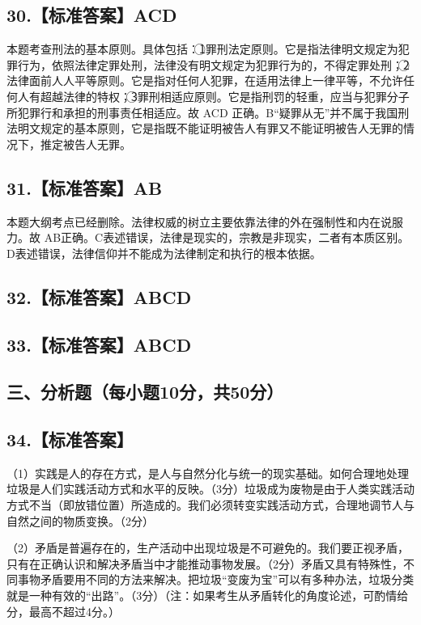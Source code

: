 \documentclass[UTF8,11pt]{ctexart}
\begin{document}
\subsection*{30.【标准答案】ACD}

本题考查刑法的基本原则。具体包括：\textcircled{1}罪刑法定原则。它是指法律明文规定为犯罪行为，依照法律定罪处刑，法律没有明文规定为犯罪行为的，不得定罪处刑；\textcircled{2}法律面前人人平等原则。它是指对任何人犯罪，在适用法律上一律平等，不允许任何人有超越法律的特权；\textcircled{3}罪刑相适应原则。它是指刑罚的轻重，应当与犯罪分子所犯罪行和承担的刑事责任相适应。故 ACD 正确。B“疑罪从无”并不属于我国刑法明文规定的基本原则，它是指既不能证明被告人有罪又不能证明被告人无罪的情况下，推定被告人无罪。


\subsection*{31.【标准答案】AB}

本题大纲考点已经删除。法律权威的树立主要依靠法律的外在强制性和内在说服力。故 AB正确。C表述错误，法律是现实的，宗教是非现实，二者有本质区别。D表述错误，法律信仰并不能成为法律制定和执行的根本依据。


\subsection*{32.【标准答案】ABCD}

\subsection*{33.【标准答案】ABCD}

\subsection*{三、分析题（每小题10分，共50分）}

\subsection*{34.【标准答案】}

（1）实践是人的存在方式，是人与自然分化与统一的现实基础。如何合理地处理垃圾是人们实践活动方式和水平的反映。（3分）垃圾成为废物是由于人类实践活动方式不当（即放错位置）所造成的。我们必须转变实践活动方式，合理地调节人与自然之间的物质变换。（2分）


（2）矛盾是普遍存在的，生产活动中出现垃圾是不可避免的。我们要正视矛盾，只有在正确认识和解决矛盾当中才能推动事物发展。（2分）矛盾又具有特殊性，不同事物矛盾要用不同的方法来解决。把垃圾“变废为宝”可以有多种办法，垃圾分类就是一种有效的“出路”。（3分）（注：如果考生从矛盾转化的角度论述，可酌情给分，最高不超过4分。）
\end{document}
